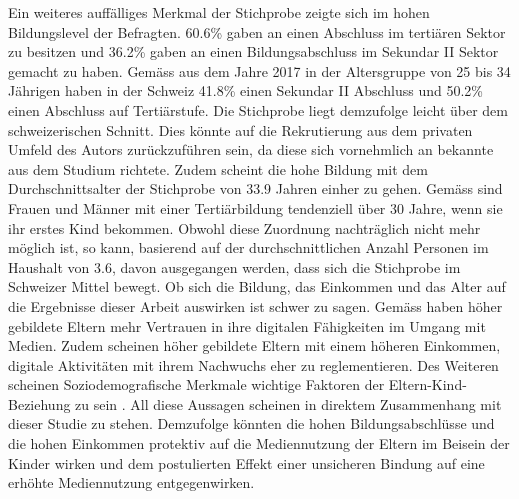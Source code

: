 Ein weiteres auffälliges Merkmal der Stichprobe zeigte sich im hohen Bildungslevel der Befragten. 60.6\% gaben an einen Abschluss im tertiären Sektor zu besitzen und 36.2\% gaben an einen Bildungsabschluss im Sekundar II Sektor gemacht zu haben. Gemäss  aus dem Jahre 2017 in der Altersgruppe von 25 bis 34 Jährigen haben in der Schweiz 41.8\% einen Sekundar II Abschluss und 50.2\% einen Abschluss auf Tertiärstufe. Die Stichprobe liegt demzufolge leicht über dem schweizerischen Schnitt. Dies könnte auf die Rekrutierung aus dem privaten Umfeld des Autors zurückzuführen sein, da diese sich vornehmlich an bekannte aus dem Studium richtete. Zudem scheint die hohe Bildung mit dem Durchschnittsalter der Stichprobe von 33.9 Jahren einher zu gehen. Gemäss  sind  Frauen und Männer mit einer Tertiärbildung tendenziell über 30 Jahre, wenn sie ihr erstes Kind bekommen. Obwohl diese Zuordnung nachträglich nicht mehr möglich ist, so kann, basierend auf der durchschnittlichen Anzahl Personen im Haushalt von 3.6, davon ausgegangen werden, dass sich die Stichprobe im Schweizer Mittel bewegt. Ob sich die Bildung, das Einkommen und das Alter auf die Ergebnisse dieser Arbeit auswirken ist schwer zu sagen. Gemäss  haben höher gebildete Eltern mehr Vertrauen in ihre digitalen Fähigkeiten im Umgang mit Medien. Zudem scheinen höher gebildete Eltern mit einem höheren Einkommen, digitale Aktivitäten mit ihrem Nachwuchs eher zu reglementieren. Des Weiteren scheinen Soziodemografische Merkmale wichtige Faktoren der Eltern-Kind-Beziehung zu sein \cite{Kammerl2012}. All diese Aussagen scheinen in direktem Zusammenhang mit dieser Studie zu stehen. Demzufolge könnten die hohen Bildungsabschlüsse und die hohen Einkommen protektiv auf die Mediennutzung der Eltern im Beisein der Kinder wirken und dem postulierten Effekt einer unsicheren Bindung auf eine erhöhte Mediennutzung entgegenwirken. 

